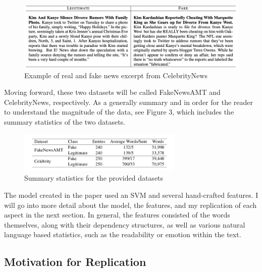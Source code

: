 \documentclass{article}
\begin{document}
\begin{figure}[]
  \includegraphics[width=\textwidth]{Results_For_Paper/CelebrityNews.png}
  \caption{Example of real and fake news excerpt from CelebrityNews}
\end{figure}

Moving forward, these two datasets will be called FakeNewsAMT and CelebrityNews, respectively. As a generally summary and in order for the reader to understand the magnitude of the data, see Figure 3, which includes the summary statistics of the two datasets.

\begin{figure}[] 
  \centering
  \includegraphics[width=0.7\textwidth]{Results_For_Paper/SummaryStats.png}
  \caption{Summary statistics for the provided datasets}
\end{figure}

The model created in the paper used an SVM and several hand-crafted features. I will go into more detail about the model, the features, and my replication of each aspect in the next section. In general, the features consisted of the words themselves, along with their dependency structures, as well as various natural language based statistics, such as the readability or emotion within the text.

\subsection{Motivation for Replication}
\end{document}
